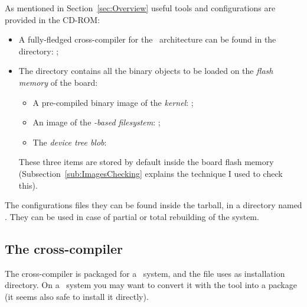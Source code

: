 As mentioned in Section~\ref{sec:Overview} useful tools and configurations
are provided in the CD-ROM:
\begin{itemize}

\item   A fully-fledged cross-compiler for the \PPC\ architecture
        can be found in the  directory:
        ;

\item   The  directory contains all the binary
        objects to be loaded on the \emph{flash memory} of the
        board:
        \begin{itemize}
        \item   A pre-compiled binary image of the \emph{kernel}:
                ;
        \item   An image of the \emph{\BusyBox-based filesystem}:
                ;
        \item   The \emph{device tree blob}:
        \end{itemize}
        These three items are stored by default inside the board flash
        memory (Subsection~\ref{sub:ImagesChecking} explains the technique
        I used to check this).

\end{itemize}

The configurations files they can be found inside the
 tarball, in a directory named .
They can be used in case of partial or total rebuilding of the system.


\subsection{ The cross-compiler }

    The cross-compiler is packaged for a \RedHat\ system, and the
     file uses  as installation
    directory. On a \Debian\ system you may want to convert it with
    the  tool into a  package (it seems also
    safe to install it directly).



